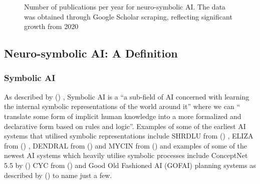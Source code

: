 \documentclass[journal]{IEEEtran}
\newcommand{\citeauthornum}[1]{\citeauthor{#1} (\citeyear{#1}) \cite{#1}}
\begin{document}
\begin{figure}[ht]
    \centering
   
    \caption{Number of publications per year for neuro-symbolic AI. The data was obtained through Google Scholar scraping, reflecting significant growth from 2020}
    \label{fig:pubs_by_year}
\end{figure}

\subsection{Neuro-symbolic AI: A Definition}

\subsubsection{\textbf{Symbolic AI}}\label{subsub:symbolic-AI}
As described by \citeauthornum{Dingli2023}, Symbolic AI is a \enquote{a sub-field of AI concerned with learning the internal symbolic representations of the world around it} where we can \enquote{ translate some form of implicit human knowledge into a more formalized and declarative form based on rules and logic}. Examples of some of the earliest AI systems that utilised symbolic representations include SHRDLU from \citeauthornum{SHRDLU}, ELIZA from \citeauthornum{Weizenbaum1966},  DENDRAL from \citeauthornum{Lindsay1980} and MYCIN from \citeauthornum{Melle1978} and examples of some of the newest AI systems which heavily utilise symbolic processes include ConceptNet 5.5 by \citeauthornum{Speer2016} CYC from \citeauthornum{Lenat2023} and Good Old Fashioned AI (GOFAI) planning systems as described by \citeauthornum{Edelkamp2004} to name just a few.
\end{document}
